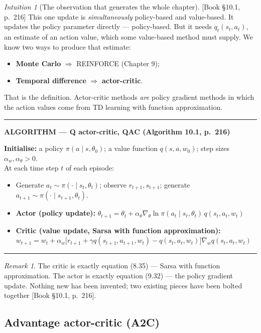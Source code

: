 \documentclass[11pt, letterpaper]{article}
\theoremstyle{runin}
\theoremstyle{runinplain}
\theoremstyle{remark}
\newtheorem*{remark}{Remark}
\newtheorem*{intuition}{Intuition}
\newcommand{\bkin}[1]{{\color{bookblue}\small[\textsf{Book #1}]}}
\newenvironment{algobox}[1]
  {\par\medskip\noindent\rule{\textwidth}{0.9pt}\par\nobreak\vspace{0.25em}
   \noindent\textbf{\small ALGORITHM --- #1}\par\nobreak\vspace{0.15em}
   \small}
  {\par\nobreak\vspace{0.25em}\noindent\rule{\textwidth}{0.9pt}\par\medskip}
\begin{document}
\begin{intuition}[The observation that generates the whole chapter]
\bkin{\S10.1, p.~216} This one update is \emph{simultaneously} policy-based and
value-based. It updates the policy parameter directly --- policy-based. But it needs
$q_t(s_t,a_t)$, an estimate of an action value, which some value-based method must
supply. We know two ways to produce that estimate:
\begin{itemize}
  \item \textbf{Monte Carlo} $\Rightarrow$ REINFORCE (Chapter 9);
  \item \textbf{Temporal difference} $\Rightarrow$ \textbf{actor-critic}.
\end{itemize}
That is the definition. Actor-critic methods \emph{are} policy gradient methods in
which the action values come from TD learning with function approximation.
\end{intuition}

\begin{algobox}{Q actor-critic, QAC (Algorithm 10.1, p.~216)}
\textbf{Initialise:} a policy $\pi(a\mid s,\theta_0)$; a value function
$q(s,a,w_0)$; step sizes $\alpha_w,\alpha_\theta>0$.\\
At each time step $t$ of each episode:
\begin{itemize}\itemsep0pt
  \item Generate $a_t\sim\pi(\cdot\mid s_t,\theta_t)$; observe $r_{t+1},s_{t+1}$;
        generate $a_{t+1}\sim\pi(\cdot\mid s_{t+1},\theta_t)$.
  \item \textbf{Actor (policy update):}
        $\theta_{t+1}=\theta_t+\alpha_\theta\nabla_\theta\ln\pi(a_t\mid s_t,\theta_t)\,q(s_t,a_t,w_t)$
  \item \textbf{Critic (value update, Sarsa with function approximation):}
        $w_{t+1}=w_t+\alpha_w\bigl[r_{t+1}+\gamma q(s_{t+1},a_{t+1},w_t)-q(s_t,a_t,w_t)\bigr]\nabla_wq(s_t,a_t,w_t)$
\end{itemize}
\end{algobox}

\begin{remark}
The critic is exactly equation (8.35) --- Sarsa with function approximation. The actor
is exactly equation (9.32) --- the policy gradient update. Nothing new has been
invented; two existing pieces have been bolted together
\bkin{\S10.1, p.~216}.
\end{remark}

\subsection{Advantage actor-critic (A2C)}
\end{document}
